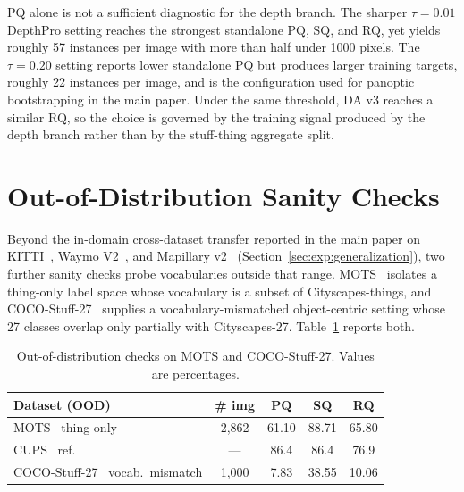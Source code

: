 \documentclass{article}
\begin{document}
PQ alone is not a sufficient diagnostic for the depth branch. The sharper $\tau{=}0.01$ DepthPro setting reaches the strongest standalone PQ, SQ, and RQ, yet yields roughly 57 instances per image with more than half under 1000 pixels. The $\tau{=}0.20$ setting reports lower standalone PQ but produces larger training targets, roughly 22 instances per image, and is the configuration used for panoptic bootstrapping in the main paper. Under the same threshold, DA v3 reaches a similar RQ, so the choice is governed by the training signal produced by the depth branch rather than by the stuff-thing aggregate split.

\section{Out-of-Distribution Sanity Checks}
\label{sec:supp:ood}

Beyond the in-domain cross-dataset transfer reported in the main paper on KITTI~\cite{geiger2012kitti}, Waymo V2~\cite{sun2020waymo}, and Mapillary v2~\cite{neuhold2017mapillary} (Section~\ref{sec:exp:generalization}), two further sanity checks probe vocabularies outside that range. MOTS~\cite{voigtlaender2019mots} isolates a thing-only label space whose vocabulary is a subset of Cityscapes-things, and COCO-Stuff-27~\cite{caesar2018coco} supplies a vocabulary-mismatched object-centric setting whose 27 classes overlap only partially with Cityscapes-27. Table~\ref{tab:cocooo} reports both.

\begin{table}[!htbp]
\caption{Out-of-distribution checks on MOTS and COCO-Stuff-27. Values are percentages.}
\label{tab:cocooo}
\centering
\footnotesize
\setlength{\tabcolsep}{6pt}
\begin{tabular}{l c c c c}
\toprule
Dataset (OOD) & \# img & PQ & SQ & RQ \\
\midrule
MOTS~\cite{voigtlaender2019mots} thing-only & 2{,}862 & 61.10 & 88.71 & 65.80 \\
\quad CUPS~\cite{hahn2025cups} ref. & --- & 86.4 & 86.4 & 76.9 \\
COCO-Stuff-27~\cite{caesar2018coco} vocab.\ mismatch & 1{,}000 & \phantom{0}7.83 & 38.55 & 10.06 \\
\bottomrule
\end{tabular}
\end{table}
\end{document}
